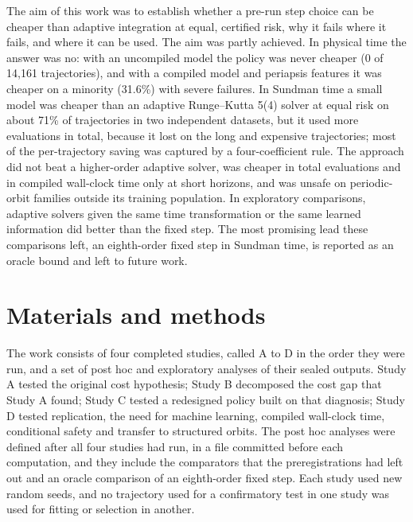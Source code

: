 \documentclass[10pt,letterpaper]{article}
\begin{document}
The aim of this work was to establish whether a pre-run step choice can be cheaper than adaptive integration at equal, certified risk, why it fails where it fails, and where it can be used. The aim was partly achieved. In physical time the answer was no: with an uncompiled model the policy was never cheaper (0 of 14,161 trajectories), and with a compiled model and periapsis features it was cheaper on a minority (31.6\%) with severe failures. In Sundman time a small model was cheaper than an adaptive Runge--Kutta 5(4) solver at equal risk on about 71\% of trajectories in two independent datasets, but it used more evaluations in total, because it lost on the long and expensive trajectories; most of the per-trajectory saving was captured by a four-coefficient rule. The approach did not beat a higher-order adaptive solver, was cheaper in total evaluations and in compiled wall-clock time only at short horizons, and was unsafe on periodic-orbit families outside its training population. In exploratory comparisons, adaptive solvers given the same time transformation or the same learned information did better than the fixed step. The most promising lead these comparisons left, an eighth-order fixed step in Sundman time, is reported as an oracle bound and left to future work.

\section*{Materials and methods}

The work consists of four completed studies, called A to D in the order they were run, and a set of post hoc and exploratory analyses of their sealed outputs. Study A tested the original cost hypothesis; Study B decomposed the cost gap that Study A found; Study C tested a redesigned policy built on that diagnosis; Study D tested replication, the need for machine learning, compiled wall-clock time, conditional safety and transfer to structured orbits. The post hoc analyses were defined after all four studies had run, in a file committed before each computation, and they include the comparators that the preregistrations had left out and an oracle comparison of an eighth-order fixed step. Each study used new random seeds, and no trajectory used for a confirmatory test in one study was used for fitting or selection in another.
\end{document}
